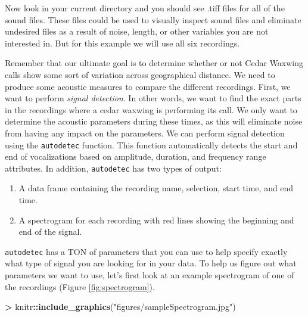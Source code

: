 \documentclass[]{krantz}
\makeatletter
\newenvironment{Shaded}{\begin{snugshade}}{\end{snugshade}}
\newcommand{\KeywordTok}[1]{\textcolor[rgb]{0.27,0.27,0.27}{\textbf{#1}}}
\newcommand{\NormalTok}[1]{#1}
\newcommand{\OperatorTok}[1]{\textcolor[rgb]{0.43,0.43,0.43}{\textbf{#1}}}
\newcommand{\StringTok}[1]{\textcolor[rgb]{0.5,0.5,0.5}{#1}}
\providecommand{\tightlist}{%
  \setlength{\itemsep}{0pt}\setlength{\parskip}{0pt}}
\newenvironment{kframe}{%
\medskip{}
\setlength{\fboxsep}{.8em}
 \def\at@end@of@kframe{}%
 \ifinner\ifhmode%
  \def\at@end@of@kframe{\end{minipage}}%
  \begin{minipage}{\columnwidth}%
 \fi\fi%
 \def\FrameCommand##1{\hskip\@totalleftmargin \hskip-\fboxsep
 \colorbox{shadecolor}{##1}\hskip-\fboxsep
     \hskip-\linewidth \hskip-\@totalleftmargin \hskip\columnwidth}%
 \MakeFramed {\advance\hsize-\width
   \@totalleftmargin\z@ \linewidth\hsize
   \@setminipage}}%
 {\par\unskip\endMakeFramed%
 \at@end@of@kframe}
\renewenvironment{Shaded}{\begin{kframe}}{\end{kframe}}
\makeatother
\begin{document}
Now look in your current directory and you should see .tiff files for all of the sound files. These files could be used to visually inspect sound files and eliminate undesired files as a result of noise, length, or other variables you are not interested in. But for this example we will use all six recordings.

Remember that our ultimate goal is to determine whether or not Cedar Waxwing calls show some sort of variation across geographical distance. We need to produce some acoustic measures to compare the different recordings. First, we want to perform \emph{signal detection}. In other words, we want to find the exact parts in the recordings where a cedar waxwing is performing its call. We only want to determine the acoustic parameters during these times, as this will eliminate noise from having any impact on the parameters. We can perform signal detection using the \texttt{autodetec} function. This function automatically detects the start and end of vocalizations based on amplitude, duration, and frequency range attributes. In addition, \texttt{autodetec} has two types of output:

\begin{enumerate}
\def\labelenumi{\arabic{enumi}.}
\tightlist
\item
  A data frame containing the recording name, selection, start time, and end time.
\item
  A spectrogram for each recording with red lines showing the beginning and end of the signal.
\end{enumerate}

\texttt{autodetec} has a TON of parameters that you can use to help specify exactly what type of signal you are looking for in your data. To help us figure out what parameters we want to use, let's first look at an example spectrogram of one of the recordings (Figure \ref{fig:spectrogram}).

\begin{Shaded}
\begin{Highlighting}[]
\OperatorTok{>}\StringTok{ }\NormalTok{knitr}\OperatorTok{::}\KeywordTok{include_graphics}\NormalTok{(}\StringTok{"figures/sampleSpectrogram.jpg"}\NormalTok{)}
\end{Highlighting}
\end{Shaded}
\end{document}

